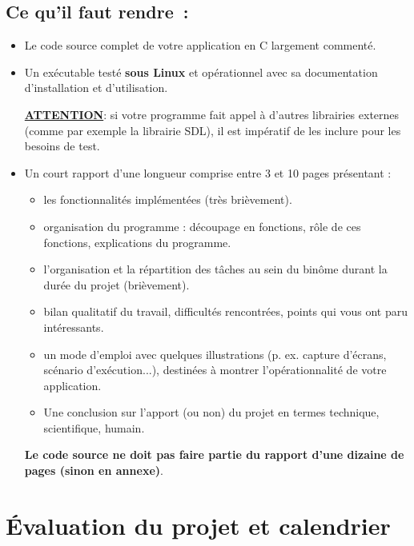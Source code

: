 \documentclass[10pt]{article}
\begin{document}
\subsection*{Ce qu'il faut rendre~:}
\begin{itemize}
\item Le code source complet de votre application en C largement commenté.

\item Un exécutable testé \textbf{sous Linux} et opérationnel avec sa documentation d'installation et d'utilisation. 

\underline{\bf ATTENTION}:
si votre programme fait appel à d'autres librairies externes (comme par exemple la librairie SDL), il est impératif de les inclure pour les besoins de test.

\item Un court rapport d'une longueur comprise entre 3 et 10 pages présentant :
\begin{itemize}
\item les fonctionnalités implémentées (très brièvement).
\item organisation du programme : découpage en fonctions, rôle de ces fonctions, explications du programme. 
\item l'organisation et la répartition des tâches au sein du binôme 
      durant la durée du projet (brièvement).
    \item bilan qualitatif du travail, difficultés rencontrées, points qui 
      vous ont paru intéressants. 
    \item un mode d'emploi avec quelques illustrations (p. ex. capture d'écrans, 
      scénario d'exécution...), destinées à montrer l'opérationnalité 
      de votre application.
    \item Une conclusion sur l'apport (ou non) du projet en termes technique,
      scientifique, humain. 
  \end{itemize}

\textbf{Le code source ne doit pas faire partie du rapport d'une dizaine de pages 
(sinon en annexe)}.
\end{itemize}

\section{Évaluation du projet et calendrier}
\end{document}

